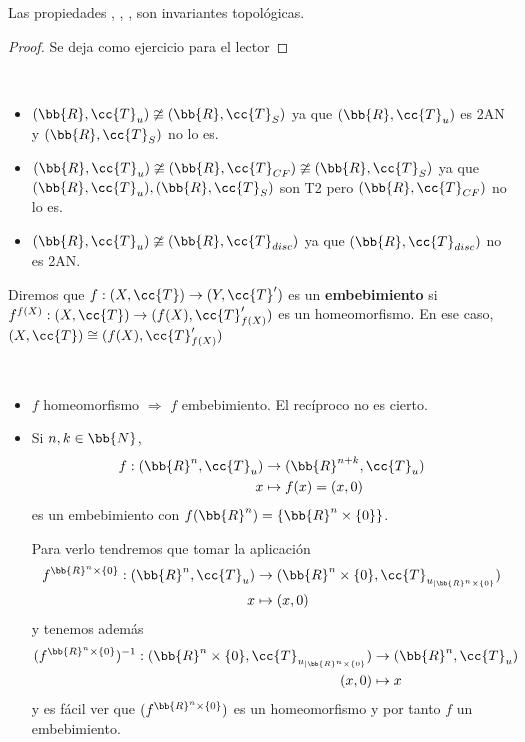 \begin{prop}
    Las propiedades , , ,  son invariantes topológicas.
    \begin{proof}
        Se deja como ejercicio para el lector %
    \end{proof}
\end{prop}

\begin{ejemplo}\
    \begin{itemize}
        \item $(\bb{R}, \cc{T}_u)\ncong (\bb{R}, \cc{T}_S)$ ya que $(\bb{R}, \cc{T}_u)$ es 2AN y $(\bb{R}, \cc{T}_S)$ no lo es.
        \item $(\bb{R}, \cc{T}_u)\ncong (\bb{R}, \cc{T}_{CF})\ncong (\bb{R}, \cc{T}_S)$ ya que $(\bb{R}, \cc{T}_u), (\bb{R}, \cc{T}_S)$ son T2 pero $(\bb{R}, \cc{T}_{CF})$ no lo es.
        \item $(\bb{R}, \cc{T}_u)\ncong (\bb{R}, \cc{T}_{disc})$ ya que $(\bb{R}, \cc{T}_{disc})$ no es 2AN.
    \end{itemize}
    \endsquare
\end{ejemplo}

\begin{definicion}
    Diremos que $f:(X, \cc{T})\to (Y, \cc{T}')$ es un \textbf{embebimiento} si $f^{f(X)}:(X, \cc{T})\to (f(X), \cc{T}_{f(X)}')$ es un homeomorfismo.
    En ese caso, $(X, \cc{T})\cong(f(X), \cc{T}_{f(X)}')$
    \endsquare
\end{definicion}

\begin{ejemplo}\
    \begin{itemize}
        \item $f$ homeomorfismo $\Rightarrow$ $f$ embebimiento. El recíproco no es cierto.
        \item Si $n, k \in \bb{N}$,
        \begin{align*}
            f:(\bb{R}^n, \cc{T}_u)&\to (\bb{R}^{n+k}, \cc{T}_u)\\
            x &\mapsto f(x)=(x,0)
        \end{align*}
        es un embebimiento con $f(\bb{R}^n)=\{\bb{R}^n \times \{0\}\}$.

        Para verlo tendremos que tomar la aplicación 
        \begin{align*}
            f^{\bb{R}^n\times \{0\}}:(\bb{R}^n, \cc{T}_u)&\to (\bb{R}^n\times \{0\}, \cc{T}_{u_{|\bb{R}^n\times \{0\}}})\\
            x &\mapsto (x,0)
        \end{align*}
        y tenemos además
        \begin{align*}
            (f^{\bb{R}^n\times \{0\}})^{-1}:(\bb{R}^n\times \{0\}, \cc{T}_{u_{|\bb{R}^n\times \{0\}}})&\to (\bb{R}^n, \cc{T}_u)\\
            (x,0) &\mapsto x
        \end{align*}
        y es fácil ver que $(f^{\bb{R}^n\times \{0\}})$ es un homeomorfismo y por tanto $f$ un embebimiento.
    \end{itemize}
    \endsquare
\end{ejemplo}

